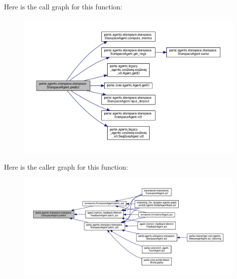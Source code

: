 Here is the call graph for this function\+:
\nopagebreak
\begin{figure}[H]
\begin{center}
\leavevmode
\includegraphics[width=350pt]{classparlai_1_1agents_1_1starspace_1_1starspace_1_1StarspaceAgent_a16753fa083c07bcdb8164116d8288b39_cgraph}
\end{center}
\end{figure}
Here is the caller graph for this function\+:
\nopagebreak
\begin{figure}[H]
\begin{center}
\leavevmode
\includegraphics[width=350pt]{classparlai_1_1agents_1_1starspace_1_1starspace_1_1StarspaceAgent_a16753fa083c07bcdb8164116d8288b39_icgraph}
\end{center}
\end{figure}
\mbox{\label{classparlai_1_1agents_1_1starspace_1_1starspace_1_1StarspaceAgent_a4d5057250faeae3f3812603469daa282}} 
